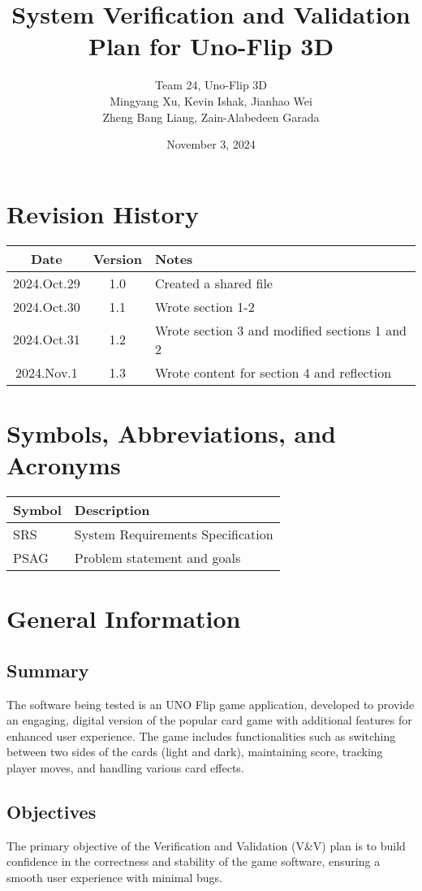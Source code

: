 \documentclass{article}
\title{System Verification and Validation Plan for Uno-Flip 3D}
\author{Team 24, Uno-Flip 3D \\ Mingyang Xu, Kevin Ishak, Jianhao Wei \\ Zheng Bang Liang, Zain-Alabedeen Garada}
\date{November 3, 2024}
\begin{document}
\maketitle

\section*{Revision History}
\begin{longtable}{|c|c|p{10cm}|}
\hline
Date & Version & Notes \\
\hline
2024.Oct.29 & 1.0 & Created a shared file \\
2024.Oct.30 & 1.1 & Wrote section 1-2 \\
2024.Oct.31 & 1.2 & Wrote section 3 and modified sections 1 and 2 \\
2024.Nov.1 & 1.3 & Wrote content for section 4 and reflection \\
\hline
\end{longtable}

\tableofcontents

\newpage

\section{Symbols, Abbreviations, and Acronyms}
\begin{longtable}{|l|p{12cm}|}
\hline
\textbf{Symbol} & \textbf{Description} \\
\hline
SRS & System Requirements Specification \\
PSAG & Problem statement and goals \\
\hline
\end{longtable}

\section{General Information}
\subsection{Summary}
The software being tested is an UNO Flip game application, developed to provide an engaging, digital version of the popular card game with additional features for enhanced user experience. The game includes functionalities such as switching between two sides of the cards (light and dark), maintaining score, tracking player moves, and handling various card effects.

\subsection{Objectives}
The primary objective of the Verification and Validation (V\&V) plan is to build confidence in the correctness and stability of the game software, ensuring a smooth user experience with minimal bugs.
\end{document}

